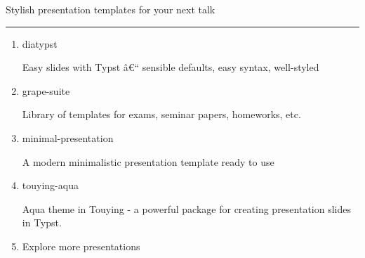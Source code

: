 Stylish presentation templates for your next talk

\begin{center}\rule{0.5\linewidth}{0.5pt}\end{center}

\begin{enumerate}
\item
  \href{https://typst.app/universe/package/diatypst/}{}

  

  diatypst

  Easy slides with Typst â€`` sensible defaults, easy syntax,
  well-styled
\item
  \href{https://typst.app/universe/package/grape-suite/}{}

  

  grape-suite

  Library of templates for exams, seminar papers, homeworks, etc.
\item
  \href{https://typst.app/universe/package/minimal-presentation/}{}

  

  minimal-presentation

  A modern minimalistic presentation template ready to use
\item
  \href{https://typst.app/universe/package/touying-aqua/}{}

  

  touying-aqua

  Aqua theme in Touying - a powerful package for creating presentation
  slides in Typst.
\item
  \href{/universe/search/?category=presentation}{}

  Explore more presentations
\end{enumerate}

